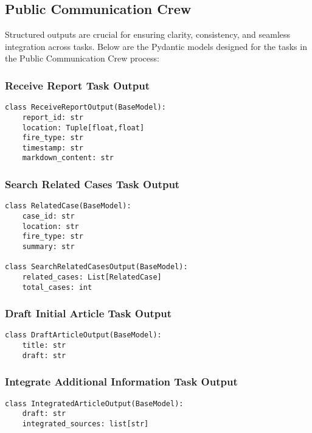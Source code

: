 \subsection{Public Communication Crew}

Structured outputs are crucial for ensuring clarity, consistency, and seamless integration across tasks. Below are the Pydantic models designed for the tasks in the Public Communication Crew process:

\subsubsection{Receive Report Task Output}
\begin{lstlisting}[caption={Pydantic model for Receive Report Task Output}]
class ReceiveReportOutput(BaseModel):
    report_id: str
    location: Tuple[float,float]
    fire_type: str
    timestamp: str
    markdown_content: str
\end{lstlisting}

\subsubsection{Search Related Cases Task Output}
\begin{lstlisting}[caption={Pydantic model for Search Related Cases Task Output}]
class RelatedCase(BaseModel):
    case_id: str
    location: str
    fire_type: str
    summary: str

class SearchRelatedCasesOutput(BaseModel):
    related_cases: List[RelatedCase]
    total_cases: int
\end{lstlisting}

\subsubsection{Draft Initial Article Task Output}
\begin{lstlisting}[caption={Pydantic model for Draft Initial Article Task Output}]
class DraftArticleOutput(BaseModel):
    title: str
    draft: str
\end{lstlisting}

\subsubsection{Integrate Additional Information Task Output}
\begin{lstlisting}[caption={Pydantic model for Integrate Additional Information Task Output}]
class IntegratedArticleOutput(BaseModel):
    draft: str
    integrated_sources: list[str]
\end{lstlisting}

